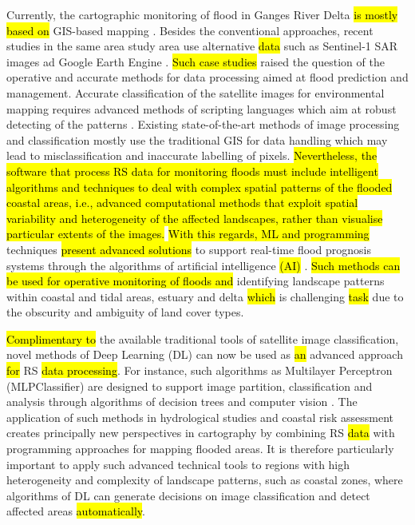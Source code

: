 \documentclass[water,article,submit,pdftex,moreauthors]{Definitions/mdpi}
\begin{document}
Currently, the cartographic monitoring of flood in Ganges River Delta \hl{is mostly based on} GIS-based mapping \cite{Sanyal2023,ISLAM2023167,RANA2023}. Besides the conventional approaches, recent studies in the same area study area use alternative \hl{data} such as Sentinel-1 SAR images ad Google Earth Engine \cite{ChakmaAkter,SINGHA2020278}. \hl{Such case studies} raised the question of the operative and accurate methods for data processing aimed at flood prediction and management. Accurate classification of the satellite images for environmental mapping requires advanced methods of scripting languages which aim at robust detecting of the patterns \cite{YANG2020100413,Lemenkova202322,BEVERIDGE2020104843,SADIQ2023111233,Lemenkova202227}. Existing state-of-the-art methods of image processing and classification mostly use the traditional GIS for data handling which may lead to misclassification and inaccurate labelling of pixels. \hl{Nevertheless, the software that process RS data for monitoring floods must include intelligent algorithms and techniques to deal with complex spatial patterns of the flooded coastal areas, i.e., advanced computational methods that exploit spatial variability and heterogeneity of the affected landscapes, rather than visualise particular extents of the images.} \hl{With this regards, ML and programming} techniques \hl{present advanced solutions} to support real-time flood prognosis systems through the algorithms of artificial intelligence\hl{ (AI)} \cite{ZHAO2021126777}. \hl{Such methods can be used for operative monitoring of floods and }identifying landscape patterns within coastal and tidal areas, estuary and delta \hl{which }is challenging \hl{task }due to the obscurity and ambiguity of land cover types. 

\hl{Complimentary to} the available traditional tools of satellite image\hl{ }classification, novel methods of Deep Learning (DL) can now be used as \hl{an} advanced approach \hl{for} RS \hl{data processing}. For instance, such algorithms as Multilayer Perceptron (MLPClassifier) are designed to support image partition, classification and analysis through algorithms of decision trees and computer vision \cite{6493388,6422192,7507955}. The application of such methods in hydrological studies and coastal risk assessment creates principally new perspectives in cartography by combining RS \hl{data }with programming approaches for mapping flooded areas. It is therefore particularly important to apply such advanced technical tools to regions with high heterogeneity and complexity of landscape patterns, such as coastal zones, where algorithms of DL can generate decisions on image classification and detect affected areas \hl{automatically}. 
\end{document}
